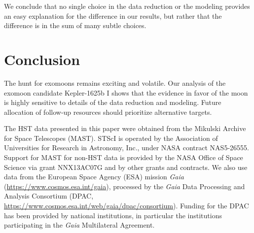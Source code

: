 \documentclass[twocolumn]{aastex62}
\begin{document}
 We conclude that no single choice in the data reduction or the modeling provides an easy explanation for the difference in our results, but rather that the difference is in the sum of many subtle choices.

\section{Conclusion}
The hunt for exomoons remains exciting and volatile. Our analysis of the exomoon candidate Kepler-1625b I shows that the evidence in favor of the moon is highly sensitive to details of the data reduction and modeling. Future allocation of follow-up resources should prioritize alternative targets.



\acknowledgments
The HST data presented in this paper were obtained from the Mikulski Archive for Space Telescopes (MAST). STScI is operated by the Association of Universities for Research in Astronomy, Inc., under NASA contract NAS5-26555. Support for MAST for non-HST data is provided by the NASA Office of Space Science via grant NNX13AC07G and by other grants and contracts.  We also use data from the European Space Agency (ESA) mission {\it Gaia} (\url{https://www.cosmos.esa.int/gaia}), processed by the {\it Gaia} Data Processing and Analysis Consortium (DPAC, \url{https://www.cosmos.esa.int/web/gaia/dpac/consortium}). Funding for the DPAC has been provided by national institutions, in particular the institutions participating in the {\it Gaia} Multilateral Agreement.  %
\end{document}
